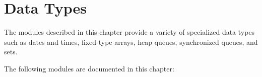 \chapter{Data Types}
\label{datatypes}

The modules described in this chapter provide a variety of specialized
data types such as dates and times, fixed-type arrays, heap queues,
synchronized queues, and sets.

The following modules are documented in this chapter:

\localmoduletable
